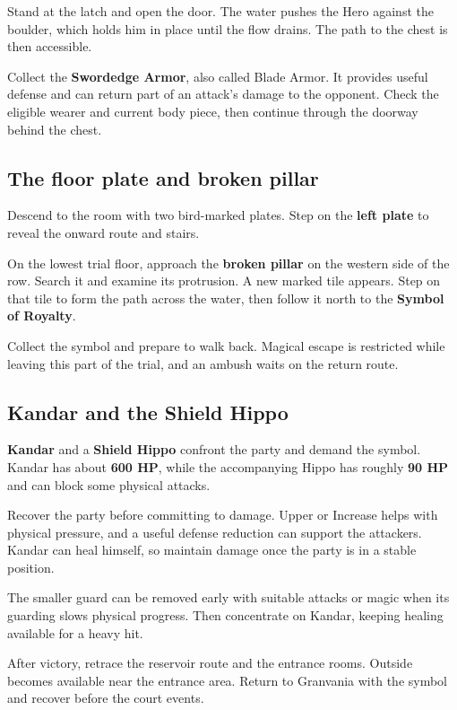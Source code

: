 Stand at the latch and open the door. The water pushes the Hero
against the boulder, which holds him in place until the flow drains.
The path to the chest is then accessible.

Collect the \textbf{Swordedge Armor}, also called Blade Armor.
It provides useful defense and can return part of an attack's damage
to the opponent. Check the eligible wearer and current body piece,
then continue through the doorway behind the chest.

\subsection*{The floor plate and broken pillar}

Descend to the room with two bird-marked plates. Step on the
\textbf{left plate} to reveal the onward route and stairs.

On the lowest trial floor, approach the \textbf{broken pillar}
on the western side of the row. Search it and examine its protrusion.
A new marked tile appears. Step on that tile to form the path
across the water, then follow it north to the
\textbf{Symbol of Royalty}.

Collect the symbol and prepare to walk back. Magical escape is
restricted while leaving this part of the trial, and an ambush waits
on the return route.

\subsection*{Kandar and the Shield Hippo}

\textbf{Kandar} and a \textbf{Shield Hippo} confront the party
and demand the symbol. Kandar has about \textbf{600 HP}, while
the accompanying Hippo has roughly \textbf{90 HP} and can block
some physical attacks.

Recover the party before committing to damage. Upper or Increase
helps with physical pressure, and a useful defense reduction can
support the attackers. Kandar can heal himself, so maintain damage
once the party is in a stable position.

The smaller guard can be removed early with suitable attacks or
magic when its guarding slows physical progress. Then concentrate
on Kandar, keeping healing available for a heavy hit.

After victory, retrace the reservoir route and the entrance rooms.
Outside becomes available near the entrance area. Return to
Granvania with the symbol and recover before the court events.

